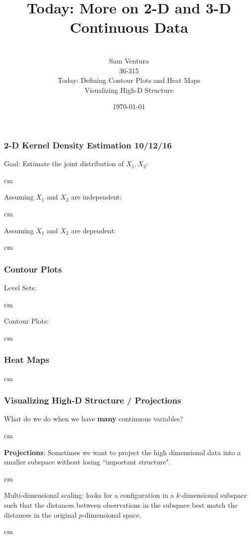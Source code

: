 \documentclass{beamer} %
\begin{document}
\title[dedup]{Today:  More on 2-D and 3-D Continuous Data}


\author[Samuel L. Ventura]{\\
  \large{Sam Ventura\\36-315\\Today:  Defining Contour Plots and Heat Maps\\Visualizing High-D Structure}}
\date{\today}


\begin{frame}
	\maketitle

	
\end{frame}



\begin{frame}\frametitle{2-D Kernel Density Estimation \hfill 10/12/16}
	\small
	
	Goal:  Estimate the joint distribution of $X_1, X_2$:
	
	 cm
	
	Assuming $X_1$ and $X_2$ are independent:
	
	 cm
	
	Assuming $X_1$ and $X_2$ are dependent:
	
	 cm
	
\end{frame}


\begin{frame}\frametitle{Contour Plots}
	\small
	
	Level Sets:
	
	 cm
	
	Contour Plots:
	
	 cm
	
\end{frame}


\begin{frame}\frametitle{Heat Maps}
	\small
	
	
	 cm
	
\end{frame}


\begin{frame}\frametitle{Visualizing High-D Structure / Projections}
	\small
	
	What do we do when we have \textbf{many} continuous variables?
	
	 cm
	
	\textbf{Projections}:  Sometimes we want to project the high dimensional data into a smaller subspace without losing ``important structure".
	
	 cm
	
	Multi-dimensional scaling:  looks for a configuration in a $k$-dimensional subspace such that the distances between observations in the subspace best match the distances in the original $p$-dimensional space.
	
	
	
	 cm
	
\end{frame}
\end{document}
